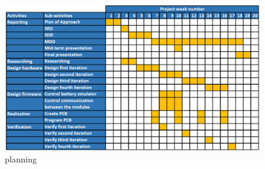 \begin{figure}[ht!]
    \centering
    \includegraphics[width=\textwidth]{images/Broad_planning.png}
    \caption{planning}
    \label{tab:planning}
\end{figure}

